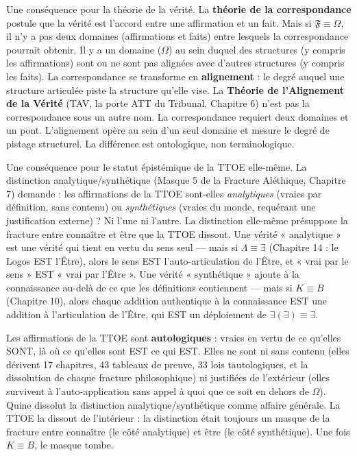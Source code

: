 \documentclass[10pt, openany, oneside]{book}
\begin{document}
Une conséquence pour la théorie de la vérité. La \textbf{théorie de la correspondance} postule que la vérité est l'accord entre une affirmation et un fait. Mais si $\mathfrak{F} \equiv \Omega$, il n'y a pas deux domaines (affirmations et faits) entre lesquels la correspondance pourrait obtenir. Il y a un domaine ($\Omega$) au sein duquel des structures (y compris les affirmations) sont ou ne sont pas alignées avec d'autres structures (y compris les faits). La correspondance se transforme en \textbf{alignement} : le degré auquel une structure articulée piste la structure qu'elle vise. La \textbf{Théorie de l'Alignement de la Vérité} (TAV, la porte ATT du Tribunal, Chapitre 6) n'est pas la correspondance sous un autre nom. La correspondance requiert deux domaines et un pont. L'alignement opère au sein d'un seul domaine et mesure le degré de pistage structurel. La différence est ontologique, non terminologique.

Une conséquence pour le statut épistémique de la TTOE elle-même. La distinction analytique/synthétique (Masque 5 de la Fracture Aléthique, Chapitre 7) demande : les affirmations de la TTOE sont-elles \textit{analytiques} (vraies par définition, sans contenu) ou \textit{synthétiques} (vraies du monde, requérant une justification externe) ? Ni l'une ni l'autre. La distinction elle-même présuppose la fracture entre connaître et être que la TTOE dissout. Une vérité « analytique » est une vérité qui tient en vertu du sens seul --- mais si $\Lambda \equiv \exists$ (Chapitre 14 : le Logos EST l'Être), alors le sens EST l'auto-articulation de l'Être, et « vrai par le sens » EST « vrai par l'Être ». Une vérité « synthétique » ajoute à la connaissance au-delà de ce que les définitions contiennent --- mais si $K \equiv B$ (Chapitre 10), alors chaque addition authentique à la connaissance EST une addition à l'articulation de l'Être, qui EST un déploiement de $\exists(\exists) \equiv \exists$.

Les affirmations de la TTOE sont \textbf{autologiques} : vraies en vertu de ce qu'elles SONT, là où ce qu'elles sont EST ce qui EST. Elles ne sont ni sans contenu (elles dérivent 17 chapitres, 43 tableaux de preuve, 33 lois tautologiques, et la dissolution de chaque fracture philosophique) ni justifiées de l'extérieur (elles survivent à l'auto-application sans appel à quoi que ce soit en dehors de $\Omega$). Quine dissolut la distinction analytique/synthétique comme affaire générale. La TTOE la dissout de l'intérieur : la distinction était toujours un masque de la fracture entre connaître (le côté analytique) et être (le côté synthétique). Une fois $K \equiv B$, le masque tombe.
\end{document}

